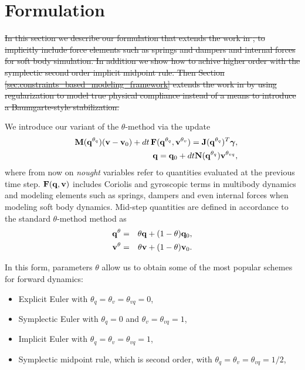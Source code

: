 \section{Formulation}

\sout{In this section we describe our formulation that extends the work in
\cite{bib:anitescu2010}, \cite{bib:todorov2014} to implicitly include force
elements such as springs and dampers and internal forces for soft body
simulation. In addition we show how to achive higher order with the symplectic
second order implicit midpoint rule. Then Section
\ref{sec:constraints_based_modeling_framework} extends the work in
\cite{bib:todorov2014} by using regularization to model true physical compliance
instead of a means to introduce a Baumgarte-style stabilization.}

We introduce our variant of the $\theta\text{-method}$ via the update 
\begin{eqnarray}
	&&\mf{M}(\mf{q}^{\theta_{q}})(\mf{v}-\mf{v}_0) + 
	dt\,\mf{F}(\mf{q}^{\theta_{q}}, \mf{v}^{\theta_v}) = \mf{J}(\mf{q}^{\theta_{q}})^T\mf{\bgamma},
	\label{eq:v_update}\\
	&&\mf{q} = \mf{q}_0 + dt\mf{N}(\mf{q}^{\theta_{q}})\mf{v}^{\theta_{vq}},
	\label{eq:q_update}
\end{eqnarray}
where from now on \textit{nought} variables refer to quantities evaluated at the
previous time step. ${\mathbf{F}}({\mathbf{q}}, {\mathbf{v}})$ includes Coriolis and gyroscopic
terms in multibody dynamics and modeling elements such as springs, dampers and
even internal forces when modeling soft body dynamics. Mid-step quantities are
defined in accordance to the standard $\theta\text{-method}$ method as
\begin{eqnarray}
	{\mathbf{q}}^{\theta} &=& \theta{\mathbf{q}} + (1-\theta){\mathbf{q}}_0,\\
	{\mathbf{v}}^{\theta} &=& \theta{\mathbf{v}} + (1-\theta){\mathbf{v}}_0.
\end{eqnarray}

In this form, parameters $\theta$ allow us to obtain some of the most popular
schemes for forward dynamics:
\begin{itemize}
	\item Explicit Euler with $\theta_q=\theta_{v}=\theta_{vq} = 0$,
	\item Symplectic Euler with $\theta_{q} = 0$ and $\theta_v = \theta_{vq}=1$,
	\item Implicit Euler with $\theta_{q} = \theta_v = \theta_{vq}= 1$,
	\item Symplectic midpoint rule, which is second order, with $\theta_{q} =
	\theta_v = \theta_{vq}= 1/2$,
\end{itemize}

